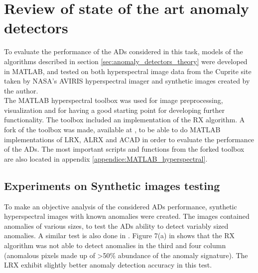 \newpage 

\chapter{Review of state of the art anomaly detectors}
\label{chapter:review_anomaly_detectors}
To evaluate the performance of the ADs considered in this task, models of the algorithms described in section \ref{sec:anomaly_detectors_theory} were developed in MATLAB, and tested on both hyperspectral image data from the Cuprite site \cite{Cuprite_data} taken by NASA's AVIRIS hyperspectral imager and synthetic images created by the author. 
\\

The MATLAB hyperspectral toolbox \cite{MATLAB_hyperspectral_toolbox} was used for image preprocessing, visualization and for having a good starting point for developing further functionality. The toolbox included an implementation of the RX algorithm. A fork of the toolbox was made, available at \cite{MATLAB_hyperspectral_toolbox_fork}, to be able to do MATLAB implementations of LRX, ALRX and ACAD in order to evaluate the performance of the ADs. The most important scripts and functions from the forked toolbox are also located in appendix \ref{appendice:MATLAB_hyperspectral}.
\section{Experiments on Synthetic images testing}
To make an objective analysis  of the considered ADs performance, synthetic hyperspectral images with known anomalies were created. The images contained anomalies of various sizes, to test the ADs ability to detect variably sized anomalies. A similar test is also done in \cite{global_and_local_rx}. Figure 7(a) in \cite{global_and_local_rx} shows that the RX algorithm was not able to detect anomalies in the third and four column (anomalous pixels made up of >50\% abundance of the anomaly signature). The LRX exhibit slightly better anomaly detection accuracy in this test.
\\

